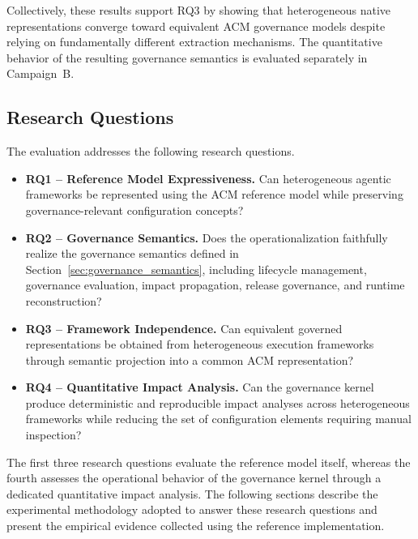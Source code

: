 \documentclass[10pt]{article}
\begin{document}
Collectively, these results support RQ3 by showing that heterogeneous native representations converge toward equivalent ACM governance models despite relying on fundamentally different extraction mechanisms. The quantitative behavior of the resulting governance semantics is evaluated separately in Campaign~B.

\subsection{Research Questions}
\label{sec:research_questions}

The evaluation addresses the following research questions.

\begin{itemize}
	
	\item \textbf{RQ1 -- Reference Model Expressiveness.}
	Can heterogeneous agentic frameworks be represented using the ACM reference model while preserving governance-relevant configuration concepts?
	
	\item \textbf{RQ2 -- Governance Semantics.}
	Does the operationalization faithfully realize the governance semantics defined in Section~\ref{sec:governance_semantics}, including lifecycle management, governance evaluation, impact propagation, release governance, and runtime reconstruction?
	
	\item \textbf{RQ3 -- Framework Independence.}
	Can equivalent governed representations be obtained from heterogeneous execution frameworks through semantic projection into a common ACM representation?
	
	\item \textbf{RQ4 -- Quantitative Impact Analysis.}
	Can the governance kernel produce deterministic and reproducible impact analyses across heterogeneous frameworks while reducing the set of configuration elements requiring manual inspection?
	
\end{itemize}

The first three research questions evaluate the reference model itself, whereas the fourth assesses the operational behavior of the governance kernel through a dedicated quantitative impact analysis.
The following sections describe the experimental methodology adopted to answer these research questions and present the empirical evidence collected using the reference implementation.
\end{document}
